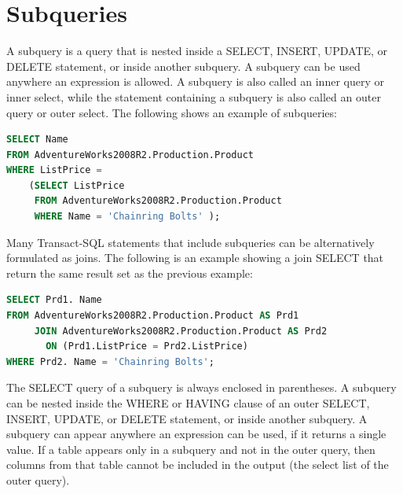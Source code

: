 \documentclass[12pt,a4paper]{article}
\begin{document}
\section{Subqueries}
A subquery is a query that is nested inside a SELECT, INSERT, UPDATE, or DELETE statement, or inside another subquery. A subquery can be used anywhere an expression is allowed. A subquery is also called an inner query or inner select, while the statement containing a subquery is also called an outer query or outer select. The following shows an example of subqueries:
\begin{lstlisting}[language=SQL,style=cool]
SELECT Name
FROM AdventureWorks2008R2.Production.Product
WHERE ListPrice =
    (SELECT ListPrice
     FROM AdventureWorks2008R2.Production.Product
     WHERE Name = 'Chainring Bolts' );
\end{lstlisting}
Many Transact-SQL statements that include subqueries can be alternatively formulated as joins. The following is an example showing a join SELECT that return the same result set as the previous example:
\begin{lstlisting}[language=SQL,style=cool]
SELECT Prd1. Name
FROM AdventureWorks2008R2.Production.Product AS Prd1
     JOIN AdventureWorks2008R2.Production.Product AS Prd2
       ON (Prd1.ListPrice = Prd2.ListPrice)
WHERE Prd2. Name = 'Chainring Bolts';
\end{lstlisting}
The SELECT query of a subquery is always enclosed in parentheses. A subquery can be nested inside the WHERE or HAVING clause of an outer SELECT, INSERT, UPDATE, or DELETE statement, or inside another subquery. A subquery can appear anywhere an expression can be used, if it returns a single value. If a table appears only in a subquery and not in the outer query, then columns from that table cannot be included in the output (the select list of the outer query).
\end{document}
